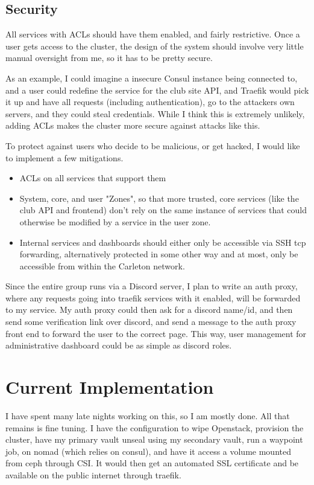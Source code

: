 \documentclass{article}
\begin{document}
\subsection{Security}
All services with ACLs should have them enabled, and fairly restrictive. Once a user gets access to the cluster, the design of the system should involve very little manual oversight from me, so it has to be pretty secure.

As an example, I could imagine a insecure Consul instance being connected to, and a user could redefine the service for the club site API, and Traefik would pick it up and have all requests (including authentication), go to the attackers own servers, and they could steal credentials. While I think this is extremely unlikely, adding ACLs makes the cluster more secure against attacks like this.

To protect against users who decide to be malicious, or get hacked, I would like to implement a few mitigations.
\begin{itemize}
    \item ACLs on all services that support them
    \item System, core, and user "Zones", so that more trusted, core services (like the club API and frontend) don't rely on the same instance of services that could otherwise be modified by a service in the user zone.
    \item Internal services and dashboards should either only be accessible via SSH tcp forwarding, alternatively protected in some other way and at most, only be accessible from within the Carleton network.
\end{itemize}
Since the entire group runs via a Discord server, I plan to write an auth proxy, where any requests going into traefik services with it enabled, will be forwarded to my service. My auth proxy could then ask for a discord name/id, and then send some verification link over discord, and send a message to the auth proxy front end to forward the user to the correct page. This way, user management for administrative dashboard could be as simple as discord roles.


\section{Current Implementation}
I have spent many late nights working on this, so I am mostly done. All that remains is fine tuning. I have the configuration to wipe Openstack, provision the cluster, have my primary vault unseal using my secondary vault, run a waypoint job, on nomad (which relies on consul), and have it access a volume mounted from ceph through CSI. It would then get an automated SSL certificate and be available on the public internet through traefik.
\end{document}
